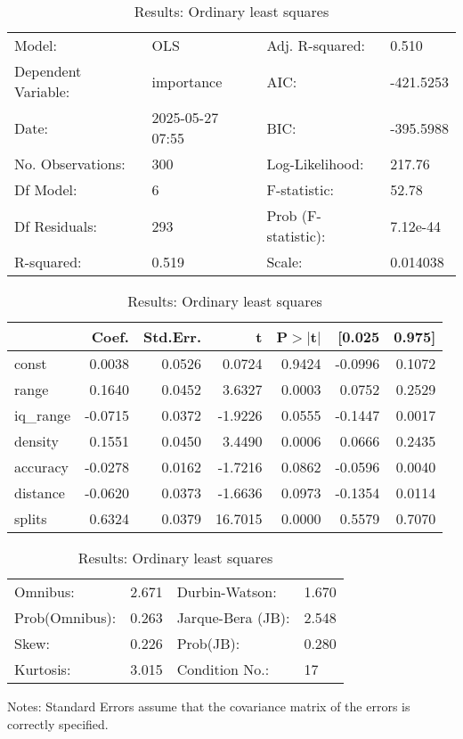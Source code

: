 \begin{table}
\caption{Results: Ordinary least squares}
\label{}
\begin{center}
\begin{tabular}{llll}
\hline
Model:              & OLS              & Adj. R-squared:     & 0.510      \\
Dependent Variable: & importance       & AIC:                & -421.5253  \\
Date:               & 2025-05-27 07:55 & BIC:                & -395.5988  \\
No. Observations:   & 300              & Log-Likelihood:     & 217.76     \\
Df Model:           & 6                & F-statistic:        & 52.78      \\
Df Residuals:       & 293              & Prob (F-statistic): & 7.12e-44   \\
R-squared:          & 0.519            & Scale:              & 0.014038   \\
\hline
\end{tabular}
\end{center}

\begin{center}
\begin{tabular}{lrrrrrr}
\hline
          &   Coef. & Std.Err. &       t & P$> |$t$|$ &  [0.025 & 0.975]  \\
\hline
const     &  0.0038 &   0.0526 &  0.0724 &      0.9424 & -0.0996 & 0.1072  \\
range     &  0.1640 &   0.0452 &  3.6327 &      0.0003 &  0.0752 & 0.2529  \\
iq\_range & -0.0715 &   0.0372 & -1.9226 &      0.0555 & -0.1447 & 0.0017  \\
density   &  0.1551 &   0.0450 &  3.4490 &      0.0006 &  0.0666 & 0.2435  \\
accuracy  & -0.0278 &   0.0162 & -1.7216 &      0.0862 & -0.0596 & 0.0040  \\
distance  & -0.0620 &   0.0373 & -1.6636 &      0.0973 & -0.1354 & 0.0114  \\
splits    &  0.6324 &   0.0379 & 16.7015 &      0.0000 &  0.5579 & 0.7070  \\
\hline
\end{tabular}
\end{center}

\begin{center}
\begin{tabular}{llll}
\hline
Omnibus:       & 2.671 & Durbin-Watson:    & 1.670  \\
Prob(Omnibus): & 0.263 & Jarque-Bera (JB): & 2.548  \\
Skew:          & 0.226 & Prob(JB):         & 0.280  \\
Kurtosis:      & 3.015 & Condition No.:    & 17     \\
\hline
\end{tabular}
\end{center}
\end{table}
\bigskip
Notes: \newline 
[1] Standard Errors assume that the covariance matrix of the errors is correctly specified.
